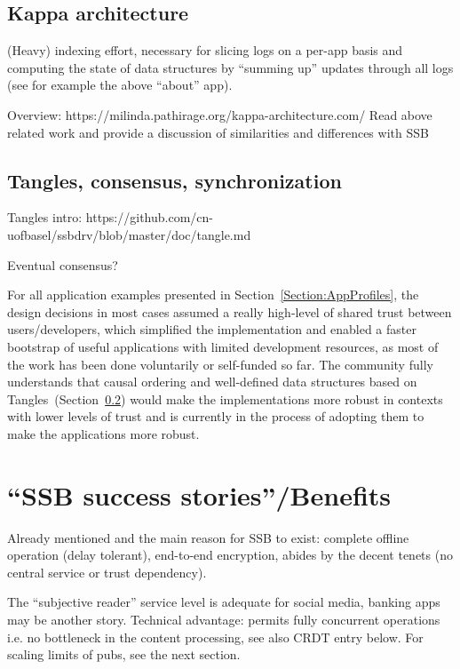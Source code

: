 \documentclass[sigconf]{acmart}
\begin{document}
\subsection{Kappa architecture}

(Heavy) indexing effort, necessary for slicing logs on a per-app basis
and computing the state of data structures by ``summing up'' updates
through all logs (see for example the above ``about'' app).

Overview: https://milinda.pathirage.org/kappa-architecture.com/
Read above related work and provide a discussion of similarities and differences with SSB

\subsection{Tangles, consensus, synchronization}
\label{Section:Tangle}

Tangles intro: https://github.com/cn-uofbasel/ssbdrv/blob/master/doc/tangle.md

Eventual consensus?

For all application examples presented in Section~\ref{Section:AppProfiles},
the design decisions in most cases assumed a really high-level of shared trust
between users/developers, which simplified the implementation and enabled a
faster bootstrap of useful applications with limited development resources, as
most of the work has been done voluntarily or self-funded so far. The community
fully understands that causal ordering and well-defined data structures based
on Tangles~(Section~\ref{Section:Tangle}) would make the implementations more
robust in contexts with lower levels of trust and is currently in the process
of adopting them to make the applications more robust.



\section{``SSB success stories''/Benefits}

Already mentioned and the main reason for SSB to exist: complete
offline operation (delay tolerant), end-to-end encryption, abides by
the decent tenets (no central service or trust dependency).

The ``subjective reader'' service level is adequate for social media,
banking apps may be another story. Technical advantage: permits fully
concurrent operations i.e. no bottleneck in the content processing,
see also CRDT entry below. For scaling limits of pubs, see the next
section.
\end{document}
